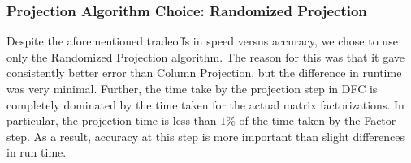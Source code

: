 \subsubsection{Projection Algorithm Choice: Randomized Projection}
Despite the aforementioned tradeoffs in speed versus accuracy, we chose 
to use only the Randomized Projection algorithm. The reason for this 
was that it gave consistently better error than Column Projection, but 
the difference in runtime was very minimal. Further, the time take by 
the projection step in DFC is completely dominated by the time taken 
for the actual matrix factorizations. In particular, the projection 
time is less than $1\%$ of the time taken by the Factor step. As 
a result, accuracy at this step is more important than slight 
differences in run time. 
